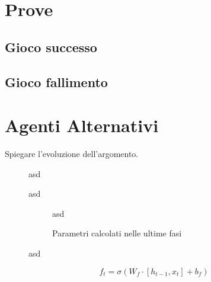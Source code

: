 \documentclass[twoside,twocolumn,10pt]{extarticle}
\theoremstyle{definition}
\begin{document}
\section{Prove}
	\subsection{Gioco successo}
	
	\subsection{Gioco fallimento}
		
\section{Agenti Alternativi}\label{}
	Spiegare l'evoluzione dell'argomento.

	\begin{figure*}[h]
		\centering
		\caption{asd}
		\label{fig:unroll}
	\end{figure*}

	\begin{figure*}[h]
		\centering
		\caption{asd}
		\label{fig:lstm}
	\end{figure*}

	\begin{figure*}[h]
		\centering
		\begin{subfigure}[b]{.496\textwidth}
			\caption{asd}
		\end{subfigure}
		\begin{subfigure}[b]{.496\textwidth}
			\caption{Parametri calcolati nelle ultime fasi}
		\end{subfigure}
		\caption{asd}
		\label{fig:parmap}
	\end{figure*}
	
	\begin{equation}\label{eq:ft}
		f_t = \sigma(W_f \cdot [h_{t - 1}, x_t] + b_f)
	\end{equation}
	
\end{document}
